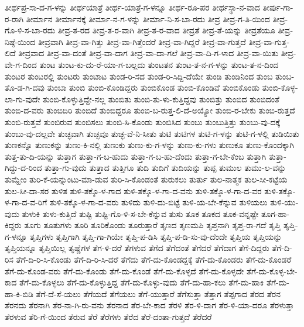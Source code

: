 {ತೀರ್ಥಪ್ರ-ಸಾ-ದ-ಗ-ಳನ್ನು
ತೀರ್ಥಯಾತ್ರೆ
ತೀರ್ಥ-ಯಾತ್ರೆ-ಗ-ಳನ್ನೂ
ತೀರ್ಥ-ರೂ-ಪರ
ತೀರ್ಥಸ್ಥಾ-ನ-ವಾದ
ತೀರ್ಪು-ಗಾ-ರ-ರಾಗಿ
ತೀರ್ಮಾನ
ತೀರ್ಮಾನಕ್ಕೆ
ತೀರ್ಮಾ-ನ-ಗ-ಳನ್ನು
ತೀರ್ಮಾ-ನಿ-ಸ-ಬಾ-ರದು
ತೀವ್ರ
ತೀವ್ರ-ಗ-ತಿ-ಯಿಂದ
ತೀವ್ರ-ಗೊ-ಳಿ-ಸ-ಬಾ-ರದು
ತೀವ್ರ-ತ-ರದ
ತೀವ್ರ-ತ-ರ-ವಾಗಿ
ತೀವ್ರ-ತ-ರ-ವಾದ
ತೀವ್ರತೆ
ತೀವ್ರ-ತೆ-ಯನ್ನು
ತೀವ್ರತೆಯೂ
ತೀವ್ರ-ನಿಷ್ಠೆ-ಯಿಂದ
ತೀವ್ರವಾಗಿ
ತೀವ್ರ-ವಾ-ಗಿತ್ತು
ತೀವ್ರ-ವಾ-ಗಿತ್ತೆಂದರೆ
ತೀವ್ರ-ವಾ-ಗಿದ್ದರೆ
ತೀವ್ರ-ವಾ-ಗುತ್ತದೆ
ತೀವ್ರ-ವಾ-ಗುತ್ತ-ಲಿದೆ
ತೀವ್ರವಾದ
ತೀವ್ರ-ವಾ-ದಂತೆ
ತೀವ್ರ-ವಾ-ದಾಗ
ತೀವ್ರ-ವಾ-ದಾ-ಗಲೆ
ತೀವ್ರ-ವಾ-ದಿ-ಗ-ಳಾದ
ತೀವ್ರ-ವಾ-ಯಿತು
ತೀವ್ರ-ವೇ-ಗ-ದಿಂದ
ತುಂಟ
ತುಂಟ-ಕು-ದು-ರೆ-ಯಾ-ಗ-ಬಲ್ಲದು
ತುಂಟತನ
ತುಂಟ-ತ-ನ-ಗ-ಳನ್ನು
ತುಂಟ-ತ-ನ-ದಿಂದ
ತುಂಟರ
ತುಂಟರಲ್ಲಿ
ತುಂಟರು
ತುಂಟಾಟ
ತುಂಡ-ರಿ-ಸದ
ತುಂಡ-ರಿ-ಸಿದ್ದಿ-ದೆಯೇ
ತುಂಡಿ
ತುಂಡಿನಿಂದ
ತುಂಬ
ತುಂಬ-ತೊ-ಡ-ಗಿ-ದವು
ತುಂಬಾ
ತುಂಬಿ
ತುಂಬಿ-ಕೊಂಡಿದ್ದರು
ತುಂಬಿಕೊಂಡ
ತುಂಬಿ-ಕೊಂಡಿವೆ
ತುಂಬಿಕೊಂಡು
ತುಂಬಿ-ಕೊಳ್ಳ-ಲಾ-ಗು-ವುದೇ
ತುಂಬಿ-ಕೊಳ್ಳುತ್ತಿದ್ದೇ-ನಲ್ಲ
ತುಂಬಿತು
ತುಂಬಿ-ತು-ಳು-ಕುತ್ತಿದ್ದವು
ತುಂಬಿತ್ತು
ತುಂಬಿದ
ತುಂಬಿದಂತೆ
ತುಂಬಿ-ದ-ವರು
ತುಂಬಿದಿರಿ
ತುಂಬಿದೆ
ತುಂಬಿದ್ದರೂ
ತುಂಬಿ-ಬ-ರುತ್ತ-ಲಿ-ದೆ-ಅಯ್ಯೋ
ತುಂಬಿ-ರ-ಬೇಕು
ತುಂಬಿ-ರುತ್ತದೆ
ತುಂಬಿ-ರುತ್ತವೆ
ತುಂಬಿರುವ
ತುಂಬಿಸಲು
ತುಂಬಿ-ಸಿ-ಕೊಂಡು
ತುಂಬಿಸಿದ
ತುಂಬು
ತುಂಬುತ್ತಿತ್ತು
ತುಂಬು-ವು-ದಕ್ಕೆ
ತುಂಬು-ವು-ದಲ್ಲವೇ
ತುಚ್ಛವಾಗಿ
ತುಚ್ಛವೂ
ತುಚ್ಛ-ವೆ-ನಿ-ಸೀತು
ತುಟಿ
ತುಟಿಗಳ
ತುಟಿ-ಗ-ಳನ್ನು
ತುಟಿ-ಗ-ಳಲ್ಲಿ
ತುಡಿಯಿತು
ತುಣಕನ್ನೊ
ತುಣುಕನ್ನು
ತುಣು-ಕಿ-ನಲ್ಲಿ
ತುಣುಕು
ತುಣು-ಕು-ಗ-ಳನ್ನು
ತುಣು-ಕು-ಗಳು
ತುಣುಕೂ
ತುಣು-ಕೊಂದಕ್ಕಾಗಿ
ತುತ್ತ-ತು-ದಿ-ಯನ್ನು
ತುತ್ತಾಗ
ತುತ್ತಾ-ಗ-ಬ-ಹುದು
ತುತ್ತಾ-ಗ-ಬ-ಹು-ದೆಂದು
ತುತ್ತಾ-ಗ-ಬೇ-ಕೆಂಬ
ತುತ್ತಾಗಿ
ತುತ್ತಾ-ಗಿದ್ದು-ದ-ರಿಂದ
ತುತ್ತಾ-ಗು-ವುದು
ತುತ್ತಾದ
ತುತ್ತಿಗೂ
ತುದಿ
ತುದಿಗೆ
ತುದಿಯನ್ನು
ತುಪ್ಪ
ತುಮುಲ
ತುಮು-ಲ-ವನ್ನು
ತುಮ್ಹೇಂ
ತುರಿ-ಕೆ-ಯನ್ನುಂಟು-ಮಾ-ಡುವ
ತುರಿ-ಸಿ-ಕೊಂಡಂತೆ
ತುರುಕಲು
ತುರ್ತು
ತುಲ-ನಾತ್ಮಕ
ತುಲ-ಸೀ-ಕಟ್ಟೆಯ
ತುಲ-ಸೀ-ದಾ-ಸರ
ತುಳಿತ
ತುಳಿ-ತಕ್ಕೊ-ಳ-ಗಾದ
ತುಳಿ-ತಕ್ಕೊ-ಳ-ಗಾ-ದ-ವನು
ತುಳಿ-ತಕ್ಕೊ-ಳ-ಗಾ-ದ-ವರ
ತುಳಿ-ತಕ್ಕೊ-ಳ-ಗಾ-ದ-ವ-ರಿಗೆ
ತುಳಿ-ತಕ್ಕೊ-ಳ-ಗಾ-ದ-ವರು
ತುಳಿದು
ತುಳಿ-ದು-ಬಿಟ್ಟೆ
ತುಳಿ-ಯ-ಬೇ-ಕೆನ್ನುವ
ತುಳಿಯಲು
ತುಳಿ-ಯು-ವುದು
ತುಳುಕಿ
ತುಳು-ಕುತ್ತಿದೆ
ತುಷ್ಟಿ
ತುಷ್ಟಿ-ಗೊ-ಳಿ-ಸ-ಬೇ-ಕೆನ್ನುವ
ತುಸು
ತೂಕ
ತೂಕದ
ತೂಕ-ವನ್ನಷ್ಟೇ
ತೂಗ-ಹಾ-ಕಿದ್ದರು
ತೂಗು
ತೂತುಗಳು
ತೂರಿ
ತೂರಿಕೊಂಡು
ತೂರುತ್ತಾರೆ
ತೃಣದ
ತೃಣಮಪಿ
ತೃಪ್ತನಾಗಿ
ತೃಪ್ತ-ರಾ-ಗದೆ
ತೃಪ್ತಿ
ತೃಪ್ತಿ-ಗ-ಳನ್ನೂ
ತೃಪ್ತಿಗಳು
ತೃಪ್ತಿಗಾಗಿ
ತೃಪ್ತಿ-ಗಾ-ಗಿಯೇ
ತೃಪ್ತಿ-ಪ-ಡಿಸಿ
ತೃಪ್ತಿ-ಪ-ಡಿ-ಸು-ವು-ದೆಂದೇ
ತೃಪ್ತಿಯ
ತೃಪ್ತಿಯನ್ನು
ತೃಪ್ತಿಯನ್ನೂ
ತೃಪ್ತಿಯಿಲ್ಲ
ತೃಷ್ಣೆಗಳ
ತೆಗ-ಳಿ-ದರೆ
ತೆಗಳುವ
ತೆಗೆದ
ತೆಗೆದಂತೆ
ತೆಗೆದರೆ
ತೆಗೆದಾಗ
ತೆಗೆ-ದಿದ್ದರು
ತೆಗೆ-ದಿ-ರಿಸ
ತೆಗೆ-ದಿ-ರಿ-ಸಿ-ಕೊಂಡು
ತೆಗೆ-ದಿ-ರಿ-ಸಿ-ದರೆ
ತೆಗೆದು
ತೆಗೆ-ದು-ಕೊಂಡದ್ದಕ್ಕೆ
ತೆಗೆ-ದು-ಕೊಂಡರು
ತೆಗೆ-ದು-ಕೊಂಡರೆ
ತೆಗೆ-ದು-ಕೊಂಡ-ವರು
ತೆಗೆ-ದು-ಕೊಂಡು
ತೆಗೆ-ದು-ಕೊಂಡೆ
ತೆಗೆ-ದು-ಕೊಳ್ಳದೆ
ತೆಗೆ-ದು-ಕೊಳ್ಳದೇ
ತೆಗೆ-ದು-ಕೊಳ್ಳ-ಬೇ-ಕಾದ
ತೆಗೆ-ದು-ಕೊಳ್ಳಲು
ತೆಗೆ-ದು-ಕೊಳ್ಳುತ್ತಿದ್ದ
ತೆಗೆ-ದು-ಕೊಳ್ಳು-ವುದು
ತೆಗೆ-ದು-ಹಾ-ಕಲು
ತೆಗೆ-ದು-ಹಾಕಿ
ತೆಗೆ-ದು-ಹಾ-ಕಿ-ಬಿಡಿ
ತೆಗೆ-ದೆ-ಸೆ-ಯಲು
ತೆಗೆಯದೆ
ತೆಗೆಯಲು
ತೆಗೆ-ಯುತ್ತಾರೆ
ತೆಗೆಸುತ್ತಾ
ತೆತ್ತಾಗ
ತೆಪ್ಪಗಾದ
ತೆರದ
ತೆರನ
ತೆರನದು
ತೆರನಾಗಿ
ತೆರ-ನಾ-ಗಿ-ರು-ವನು
ತೆರನಾದ
ತೆರ-ಬೇ-ಕಾದ
ತೆರಳಿ
ತೆರ-ಳಿ-ದಾಗ
ತೆರ-ಳಿ-ಯಾ-ದರೂ
ತೆರಳುತ್ತಾ
ತೆರಳುವ
ತೆರಿ-ಗೆ-ಯಿಂದ
ತೆರುವ
ತೆರೆ
ತೆರೆಗಳು
ತೆರೆದ
ತೆರೆ-ದಂತಾ-ಗುತ್ತದೆ
ತೆರೆದರೆ
}
